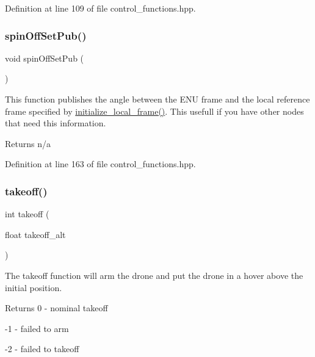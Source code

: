 Definition at line 109 of file control\+\_\+functions.\+hpp.

\mbox{\label{group__control__functions_ga60eb8f08f1ac190352a7ad6532e4f70e}} 
\subsubsection{\texorpdfstring{spinOffSetPub()}{spinOffSetPub()}}
{\footnotesize\ttfamily void spin\+Off\+Set\+Pub (\begin{DoxyParamCaption}{ }\end{DoxyParamCaption})}

This function publishes the angle between the E\+NU frame and the local reference frame specified by \mbox{\hyperlink{group__control__functions_ga2a1100bb15673a9322c5be3bb8e9999f}{initialize\+\_\+local\+\_\+frame()}}. This usefull if you have other nodes that need this information. \begin{DoxyReturn}{Returns}
n/a 
\end{DoxyReturn}


Definition at line 163 of file control\+\_\+functions.\+hpp.

\mbox{\label{group__control__functions_gac0aa671c99c09687515ec5bb8891c7d2}} 
\subsubsection{\texorpdfstring{takeoff()}{takeoff()}}
{\footnotesize\ttfamily int takeoff (\begin{DoxyParamCaption}\item[{float}]{takeoff\+\_\+alt }\end{DoxyParamCaption})}

The takeoff function will arm the drone and put the drone in a hover above the initial position. \begin{DoxyReturn}{Returns}
0 -\/ nominal takeoff 

-\/1 -\/ failed to arm 

-\/2 -\/ failed to takeoff 
\end{DoxyReturn}


